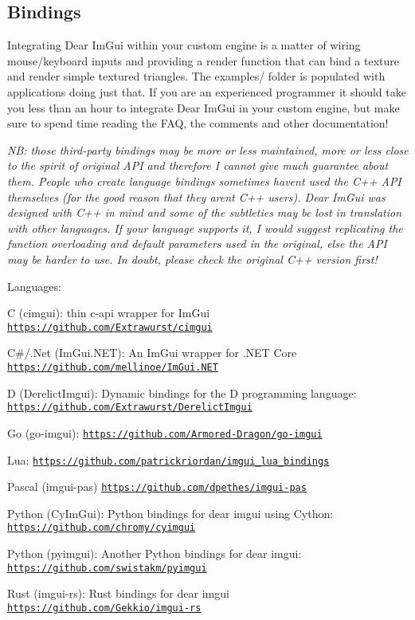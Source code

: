 \subsection*{Bindings }

Integrating Dear Im\+Gui within your custom engine is a matter of wiring mouse/keyboard inputs and providing a render function that can bind a texture and render simple textured triangles. The examples/ folder is populated with applications doing just that. If you are an experienced programmer it should take you less than an hour to integrate Dear Im\+Gui in your custom engine, but make sure to spend time reading the F\+AQ, the comments and other documentation!

{\itshape NB\+: those third-\/party bindings may be more or less maintained, more or less close to the spirit of original A\+PI and therefore I cannot give much guarantee about them. People who create language bindings sometimes haven\textquotesingle{}t used the C++ A\+PI themselves (for the good reason that they aren\textquotesingle{}t C++ users). Dear Im\+Gui was designed with C++ in mind and some of the subtleties may be lost in translation with other languages. If your language supports it, I would suggest replicating the function overloading and default parameters used in the original, else the A\+PI may be harder to use. In doubt, please check the original C++ version first!}

Languages\+:
\begin{DoxyItemize}
\item C (cimgui)\+: thin c-\/api wrapper for Im\+Gui \href{https://github.com/Extrawurst/cimgui}{\tt https\+://github.\+com/\+Extrawurst/cimgui}
\item C\#/.Net (Im\+Gui.\+N\+ET)\+: An Im\+Gui wrapper for .N\+ET Core \href{https://github.com/mellinoe/ImGui.NET}{\tt https\+://github.\+com/mellinoe/\+Im\+Gui.\+N\+ET}
\item D (Derelict\+Imgui)\+: Dynamic bindings for the D programming language\+: \href{https://github.com/Extrawurst/DerelictImgui}{\tt https\+://github.\+com/\+Extrawurst/\+Derelict\+Imgui}
\item Go (go-\/imgui)\+: \href{https://github.com/Armored-Dragon/go-imgui}{\tt https\+://github.\+com/\+Armored-\/\+Dragon/go-\/imgui}
\item Lua\+: \href{https://github.com/patrickriordan/imgui_lua_bindings}{\tt https\+://github.\+com/patrickriordan/imgui\+\_\+lua\+\_\+bindings}
\item Pascal (imgui-\/pas) \href{https://github.com/dpethes/imgui-pas}{\tt https\+://github.\+com/dpethes/imgui-\/pas}
\item Python (Cy\+Im\+Gui)\+: Python bindings for dear imgui using Cython\+: \href{https://github.com/chromy/cyimgui}{\tt https\+://github.\+com/chromy/cyimgui}
\item Python (pyimgui)\+: Another Python bindings for dear imgui\+: \href{https://github.com/swistakm/pyimgui}{\tt https\+://github.\+com/swistakm/pyimgui}
\item Rust (imgui-\/rs)\+: Rust bindings for dear imgui \href{https://github.com/Gekkio/imgui-rs}{\tt https\+://github.\+com/\+Gekkio/imgui-\/rs}
\end{DoxyItemize}

